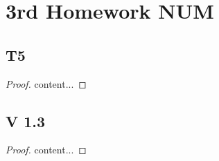 
\section{3rd Homework NUM}

\subsection{T5}
\begin{proof}
	content...
\end{proof}

\subsection{V 1.3}
\begin{proof}
	content...
\end{proof}